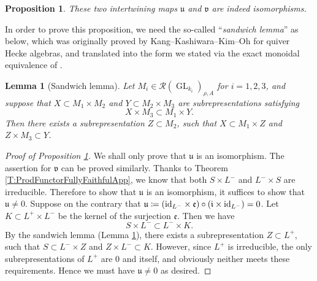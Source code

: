\documentclass[11pt,letterpaper]{amsart}
\theoremstyle{plain}
\newcounter{theorem}[section]
\numberwithin{theorem}{section}
\numberwithin{equation}{subsection}
\newtheorem{Prop}[theorem]{Proposition}
\newtheorem{Lem}[theorem]{Lemma}
\theoremstyle{remark}
\newcommand{\GL}{\operatorname{GL}}
\def\calR{\mathcal{R}}
\begin{document}
\begin{Prop}\label{P:IntMapsIsoApp}
These two intertwining maps $\mathfrak{u}$ and $\mathfrak{v}$ are indeed isomorphisms.    
\end{Prop}

\vskip 5pt

In order to prove this proposition, we need the so-called ``\emph{sandwich lemma}'' as below, which was originally proved by Kang--Kashiwara--Kim--Oh \cite[Lem. 3.1]{MR3314831} for quiver Hecke algebras, and translated into the form we stated via the exact monoidal equivalence of \cite[Thm. 3.10, Prop. 3.11]{MR4549143}.

\vskip 5pt

\begin{Lem}[Sandwich lemma]\label{L:OverlapLemmaApp}
Let $M_i\in\calR\left(\GL_{k_i}\right)_{\rho,A}$ for $i=1,2,3$, and suppose that $X\subset M_1\times M_2$ and $Y\subset M_2\times M_3$ are subrepresentations satisfying
\[
    X\times M_3 \subset M_1\times Y.
\]
Then there exists a subrepresentation $Z\subset M_2$, such that $X\subset M_1\times Z$ and $Z\times M_3\subset Y$.
\end{Lem}

\vskip 5pt

\begin{proof}[Proof of Proposition \ref{P:IntMapsIsoApp}]
We shall only prove that $\mathfrak{u}$ is an isomorphism. The assertion for $\mathfrak{v}$ can be proved similarly.
Thanks to Theorem \ref{T:ProdFunctorFullyFaithfulApp}, we know that both $S\times L^-$ and $L^-\times S$ are irreducible. Therefore to show that $\mathfrak{u}$ is an isomorphism, it suffices to show that $\mathfrak{u}\neq0$. Suppose on the contrary that $\mathfrak{u}\coloneqq \left({\rm id}_{L^-}\times\mathfrak{e}\right)\circ\left(\mathfrak{i}\times {\rm id}_{L^-}\right)=0$. Let $K\subset L^+\times L^-$ be the kernel of the surjection $\mathfrak{e}$. Then we have
\[
    S\times L^-\subset L^-\times K.
\]
By the sandwich lemma (Lemma \ref{L:OverlapLemmaApp}), there exists a subrepresentation $Z\subset L^+$, such that $S\subset L^-\times Z$ and $Z\times L^-\subset K$. However, since $L^+$ is irreducible, the only subrepresentations of $L^+$ are $0$ and itself, and obviously neither meets these requirements. Hence we must have $\mathfrak{u}\neq 0$ as desired.
    
\end{proof}

\vskip 5pt
\end{document}
